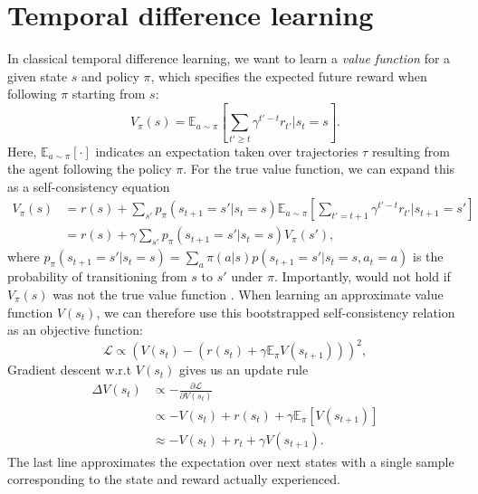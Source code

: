 \section{Temporal difference learning}
\label{sec:temporal_difference}

In classical temporal difference learning, we want to learn a \emph{value function} for a given state $s$ and policy $\pi$, which specifies the expected future reward when following $\pi$ starting from $s$:
\begin{equation}
    \label{eq:V-values}
    V_{\pi}(s) = \mathbb{E}_{a \sim \pi} \left [ \sum_{t' \geq t} \gamma^{t' - t} r_{t'} | s_t = s \right ].
\end{equation}
Here, $\mathbb{E}_{a \sim \pi} [ \cdot ]$ indicates an expectation taken over trajectories $\tau$ resulting from the agent following the policy $\pi$.
For the true value function, we can expand this as a self-consistency equation
\begin{align}
    V_{\pi}(s) &= r(s) + \sum_{s'} p_{\pi}(s_{t+1} = s' | s_t = s) \mathbb{E}_{a \sim \pi} \left [ \sum_{t' = t+1} \gamma^{t' - t} r_{t'} | s_{t+1} = s' \right ] \\
    &=  r(s) + \gamma \sum_{s'} p_{\pi}(s_{t+1} = s' | s_t = s) V_{\pi}(s'),
    \label{eq:value_expansion}
\end{align}
where $p_{\pi}(s_{t+1} = s' | s_t = s) = \sum_a \pi(a|s) p(s_{t+1} = s' | s_t = s, a_t = a)$ is the probability of transitioning from $s$ to $s'$ under $\pi$.
Importantly,  would not hold if $V_{\pi}(s)$ was not the true value function \citep{sutton2018reinforcement}.
%
When learning an approximate value function $V(s_t)$, we can therefore use this bootstrapped self-consistency relation as an objective function:
\begin{equation}
    \mathcal{L} \propto \left (  V(s_t) - (r(s_t) + \gamma \mathbb{E}_\pi V(s_{t+1})) \right )^2,
\end{equation}
Gradient descent w.r.t $V(s_t)$ gives us an update rule
\begin{align}
    \Delta V(s_t) &\propto - \frac{\partial \mathcal{L}}{\partial V(s_t)}\\
    \label{eq:TD-learning_exp}
    &\propto - V(s_t) + r(s_t) + \gamma \mathbb{E}_\pi \left [ V(s_{t+1}) \right ]\\
    \label{eq:TD-learning}
    &\approx - V(s_t) + r_t + \gamma V(s_{t+1}).
\end{align}
The last line approximates the expectation over next states with a single sample corresponding to the state and reward actually experienced.
